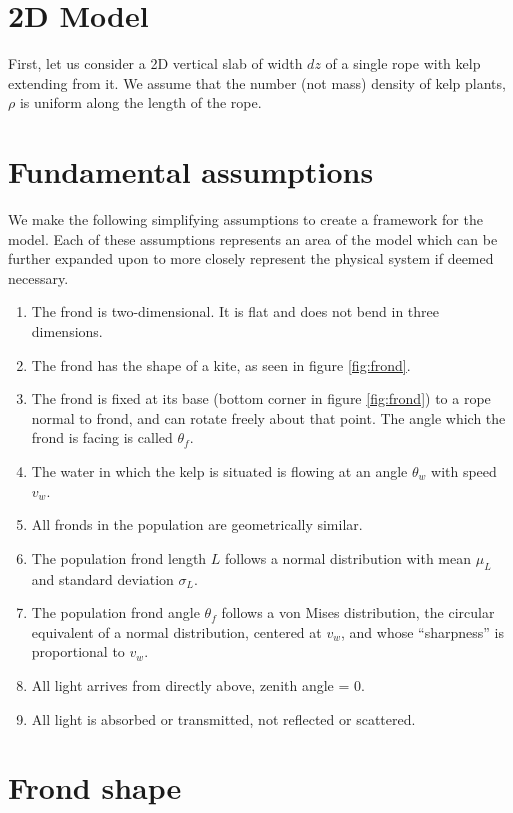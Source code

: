 \documentclass[10pt]{article}
\begin{document}
\begin{multicols}{2}
\section{2D Model}
First, let us consider a 2D vertical slab of width $dz$ of a single rope with kelp extending from it.
We assume that the number (not mass) density of kelp plants, $\rho$ is uniform along the length of the rope.

\section{Fundamental assumptions}
We make the following simplifying assumptions to create a framework for the model. Each of these assumptions represents an area of the model which can be further expanded upon to more closely represent the physical system if deemed necessary.
\begin{enumerate}
	\item The frond is two-dimensional. It is flat and does not bend in three dimensions.
	\item The frond has the shape of a kite, as seen in figure \ref{fig:frond}.
	\item The frond is fixed at its base (bottom corner in figure \ref{fig:frond}) to a rope normal to frond, and can rotate freely about that point. The angle which the frond is facing is called $\theta_f$.
	\item The water in which the kelp is situated is flowing at an angle $\theta_w$ with speed $v_w$.
	\item All fronds in the population are geometrically similar.
	\item The population frond length $L$ follows a normal distribution with mean $\mu_L$ and standard deviation $\sigma_L$.
	\item The population frond angle $\theta_f$ follows a von Mises distribution, the circular equivalent of a normal distribution, centered at $v_w$, and whose ``sharpness'' is proportional to $v_w$.
	\item All light arrives from directly above, zenith angle = 0\degree.
	\item All light is absorbed or transmitted, not reflected or scattered.
\end{enumerate}

\section{Frond shape}
\label{sec:shape}


\end{multicols}
\end{document}
